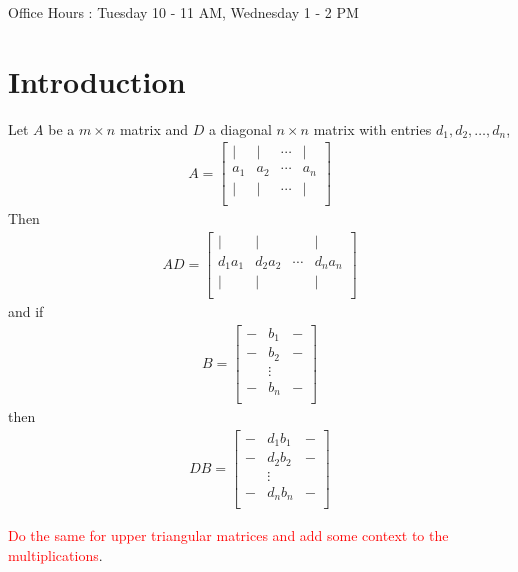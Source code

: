 

Office Hours : Tuesday 10 - 11 AM, Wednesday 1 - 2 PM

\chapter{Introduction}

Let $A$ be a $m \times n$ matrix and $D$ a diagonal $n \times n$
matrix with entries $d_1 , d_2 , \ldots , d_n$,
\begin{align*}
  A =
  \begin{bmatrix}%
    | & | & \cdots &  | \\
    a_1 & a_2 & \cdots &  a_n \\
    | & | & \cdots &  | \\
  \end{bmatrix}
\end{align*}
Then
\begin{align*}
  AD =
  \begin{bmatrix}%
    | & | & &  | \\
    d_1a_1 & d_2a_2 & \cdots &  d_na_n \\
    | & | & &  | \\
  \end{bmatrix}
\end{align*}
and if
\begin{align*}
  B =
  \begin{bmatrix}%
    - & b_1 & - \\
    - & b_2 & - \\
    & \vdots &  \\
    - & b_n & - \\
  \end{bmatrix}
\end{align*}
then
\begin{align*}
  DB =
  \begin{bmatrix}%
    - & d_1b_1 & - \\
    - & d_2b_2 & - \\
    & \vdots &  \\
    - & d_nb_n & - \\
  \end{bmatrix}
\end{align*}

\textcolor{red}{Do the same for upper triangular matrices and add
some context to the multiplications}.

